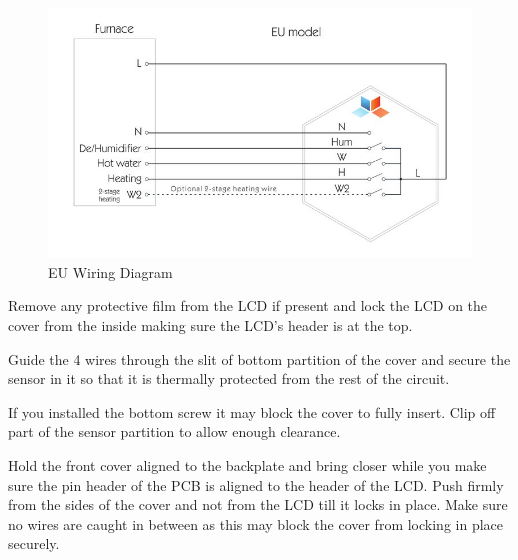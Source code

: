 \begin{figure}
  \includegraphics[width=5.0in]{img/eu-wiring-diagram.jpg}
  \caption{EU Wiring Diagram}
  \label{fig:eu}
\end{figure}

Remove any protective film from the LCD if present and lock the LCD on the
cover from the inside making sure the LCD's header is at the top.

Guide the 4 wires through the slit of bottom partition of the cover and secure
the sensor in it so that it is thermally protected from the rest of the
circuit.

If you installed the bottom screw it may block the cover to fully insert. Clip
off part of the sensor partition to allow enough clearance.

Hold the front cover aligned to the backplate and bring closer while you make
sure the pin header of the PCB is aligned to the header of the LCD. Push firmly
from the sides of the cover and not from the LCD till it locks in place. Make
sure no wires are caught in between as this may block the cover from locking in
place securely.
